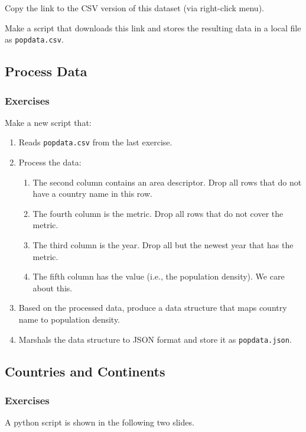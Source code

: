 {\begin{frame}[fragile]
  \vspace{5mm}
  Copy the link to the CSV version of this dataset (via right-click menu).
  
  \vspace{5mm}
  Make a script that downloads this link and stores the resulting data in a local file as \texttt{popdata.csv}.
\end{frame}

\subsection{Process Data}
\begin{frame}[fragile]
  \frametitle{Exercises }
  \vspace{3mm}
  Make a new script that:
  \begin{enumerate}
    \item Reads \texttt{popdata.csv} from the last exercise.
    \item Process the data:
      \begin{enumerate}
        \item The second column contains an area descriptor. Drop all rows that do not have a country name in this row.
        \item The fourth column is the metric. Drop all rows that do not cover the  metric.
        \item The third column is the year. Drop all but the newest year that has the  metric.
        \item The fifth column has the value (i.e., the population density). We care about this.
      \end{enumerate}
    \item Based on the processed data, produce a data structure that maps country name to population density.
    \item Marshals the data structure to JSON format and store it as \texttt{popdata.json}.
  \end{enumerate}
\end{frame}

\subsection{Countries and Continents}
\begin{frame}[fragile]
  \frametitle{Exercises }
  \vspace{3mm}
  A python script is shown in the following two slides.
  

\end{frame}}
